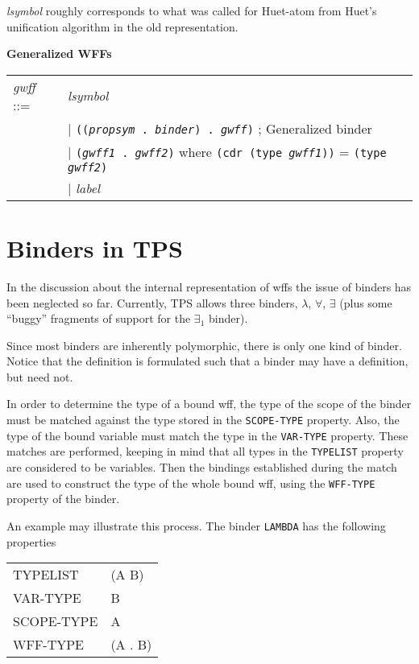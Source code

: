 {\it lsymbol} roughly corresponds to what was called
 {for Huet-atom from Huet's unification algorithm}
in the old representation.

{\bf Generalized WFFs}

\begin{tabular}{ll}
{\it gwff} ::=&   {\it lsymbol} \\
&  | {\tt (({\it propsym} . {\it binder}) . {\it gwff})}  ; Generalized binder \\
&  | {\tt ({\it gwff1} . {\it gwff2})}  where {\tt (cdr (type {\it gwff1}))} = {\tt (type {\it gwff2})} \\
&  | {\it label} \\
\end{tabular}

\section{Binders in TPS}\label{Binders} 

In the discussion about the internal representation of wffs the issue
of binders has been neglected so far.  Currently, TPS allows three
binders, $\lambda$, $\forall$, $\exists$ (plus some ``buggy'' fragments of
support for the $\exists_{1}$ binder).

Since most binders are inherently polymorphic, there is only one kind of
binder.  Notice that the definition is formulated such that a binder may
have a definition, but need not.

In order to determine the type of a bound wff, the type of the scope of
the binder must be matched against the type stored in the {\tt SCOPE-TYPE}
property.  Also, the type of the bound variable must match the
type in the {\tt VAR-TYPE} property.  These matches are performed, keeping
in mind that all types in the {\tt TYPELIST} property are considered to
be variables.  Then the bindings established during the match are used
to construct the type of the whole bound wff, using the {\tt WFF-TYPE}
property of the binder.

An example may illustrate this process.  The binder {\tt LAMBDA} has the
following properties

\begin{tabular}{ll}
TYPELIST & (A B) \\
VAR-TYPE & B \\
SCOPE-TYPE & A \\
WFF-TYPE & (A . B)
\end{tabular}

